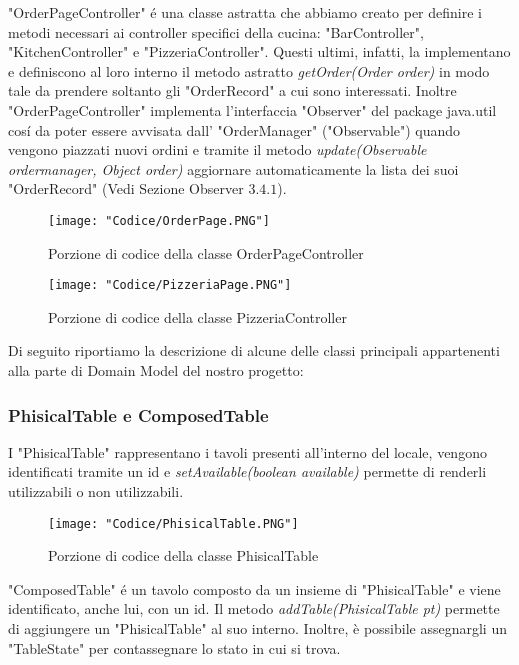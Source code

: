 \documentclass{article}
\begin{document}
"OrderPageController" \'e una classe astratta che abbiamo creato per definire i metodi necessari ai controller specifici della cucina: "BarController", "KitchenController" e "PizzeriaController". Questi ultimi, infatti, la implementano e definiscono al loro interno il metodo astratto \textit{getOrder(Order order)} in modo tale da prendere soltanto gli "OrderRecord" a cui sono interessati. Inoltre "OrderPageController" implementa l'interfaccia "Observer" del package java.util cos\'i da poter essere avvisata dall' "OrderManager" ("Observable") quando vengono piazzati nuovi ordini e tramite il metodo \textit{update(Observable ordermanager, Object order)} aggiornare automaticamente la lista dei suoi "OrderRecord" (Vedi Sezione Observer $3.4.1 $).

\begin{figure}[!h]
\centering
\texttt{[image: "Codice/OrderPage.PNG"]}
\caption{Porzione di codice della classe OrderPageController}
\end{figure}

\begin{figure}[!h]
\centering
\texttt{[image: "Codice/PizzeriaPage.PNG"]}
\caption{Porzione di codice della classe PizzeriaController}
\end{figure}

\newpage

\noindent Di seguito riportiamo la descrizione di alcune delle classi principali appartenenti alla parte di Domain Model del nostro progetto: 

\subsubsection{PhisicalTable e ComposedTable}

I "PhisicalTable" rappresentano i tavoli presenti all'interno del locale, vengono identificati tramite un id e \textit{setAvailable(boolean available)} permette di renderli utilizzabili o non utilizzabili.

\begin{figure}[!h]
\centering
\texttt{[image: "Codice/PhisicalTable.PNG"]}
\caption{Porzione di codice della classe PhisicalTable}
\end{figure}


\noindent "ComposedTable" \'e un tavolo composto da un insieme di "PhisicalTable" e viene identificato, anche lui, con un id. Il metodo \textit{addTable(PhisicalTable pt)} permette di aggiungere un "PhisicalTable" al suo interno. Inoltre, è possibile assegnargli un "TableState" per contassegnare lo stato in cui si trova.
\end{document}
